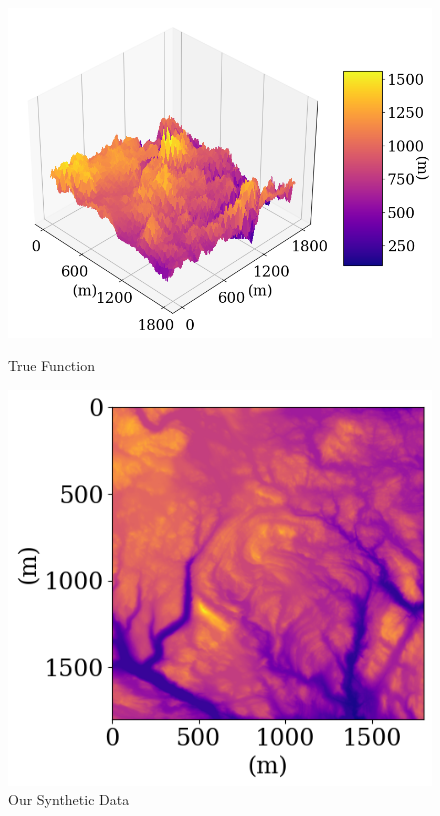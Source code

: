 \documentclass[twoside,11pt]{report}
\begin{document}
\begin{figure}[!h]
\begin{minipage}[!t]{.48\linewidth}
    \begin{center}
        \includegraphics[width=1.0\textwidth]{../runsAndAdditions/realdata3D.png}
        \caption{True Function}\label{fig:realdata3D}
\end{center}
\end{minipage}
\hspace{2mm}
\begin{minipage}[!t]{.48\linewidth}
    \begin{center}
        \includegraphics[width=1.0\textwidth]{../runsAndAdditions/realdataMap.png}
        \caption{Our Synthetic Data}\label{fig:realdataMap}
    \end{center}
\end{minipage}
\end{figure}
\end{document}
